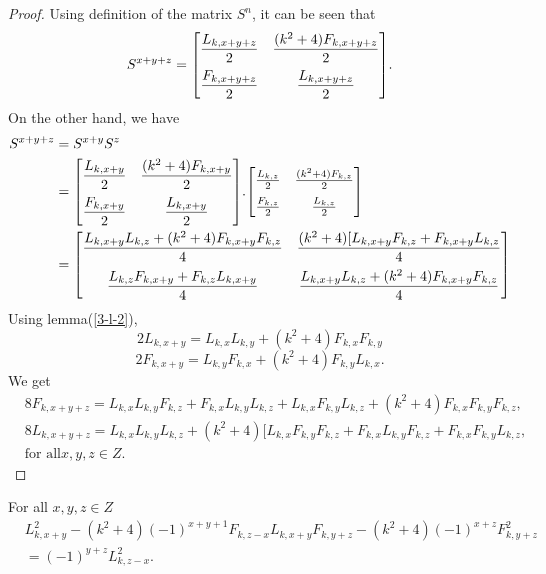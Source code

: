 \begin{proof}
Using definition of the matrix $S^n$, it can be seen that 
$$S^{x+y+z}={
 \begin{bmatrix}{}
    \dfrac{L_{k,x+y+z}}{2} & \dfrac{(k^2+4)F_{k,x+y+z}}{2}\vspace{.2cm} \\
    \dfrac{F_{k,x+y+z}}{2}& \dfrac{L_{k,x+y+z}}{2} \\
	\end{bmatrix}
	}.$$
	On the other hand, we have
	\begin{align*}
	S^{x+y+z}&=S^{x+y}S^z\\
 &={
 \begin{bmatrix}{}
    \dfrac{L_{k,x+y}}{2} & \dfrac{(k^2+4)F_{k,x+y}}{2}\vspace{.2cm} \\
    \dfrac{F_{k,x+y}}{2} & \dfrac{L_{k,x+y}}{2} \\
	\end{bmatrix}
	}.{
 \begin{bmatrix}{}
    \frac{L_{k,z}}{2} & \frac{(k^2+4)F_{k,z}}{2}\vspace{.2cm} \\
    \frac{F_{k,z}}{2} & \frac{L_{k,z}}{2} \\
	\end{bmatrix}
	}\\
 &={
 \begin{bmatrix}{}
    \dfrac{L_{k,x+y}L_{k,z}+(k^2+4)F_{k,x+y}F_{k,z}}{4} & \dfrac{(k^2+4)[L_{k,x+y}F_{k,z}+F_{k,x+y}L_{k,z}}{4}\vspace{.2cm} \\
    \dfrac{L_{k,z}F_{k,x+y}+F_{k,z}L_{k,x+y}}{4} & \dfrac{L_{k,x+y}L_{k,z}+(k^2+4)F_{k,x+y}F_{k,z}}{4} \\
	\end{bmatrix}
	}
	\end{align*}
	Using lemma(\ref{3-l-2}),
	$$2L_{k,x+y}=L_{k,x}L_{k,y}+(k^2+4)F_{k,x}F_{k,y}$$
	$$2F_{k,x+y}=L_{k,y}F_{k,x}+(k^2+4)F_{k,y}L_{k,x}.$$
We get
\begin{align*}
&8F_{k,x+y+z}=L_{k,x}L_{k,y}F_{k,z}+F_{k,x}L_{k,y}L_{k,z}+L_{k,x}F_{k,y}L_{k,z}+(k^2+4)F_{k,x}F_{k,y}F_{k,z},\\ 
&8L_{k,x+y+z}=L_{k,x}L_{k,y}L_{k,z}+(k^2+4)[L_{k,x}F_{k,y}F_{k,z}+F_{k,x}L_{k,y}F_{k,z}+F_{k,x}F_{k,y}L_{k,z}, \\&\text{for all} x,y,z\in Z.
\end{align*}
\end{proof}
\begin{theorem}
For all $x,y,z\in Z$
\begin{align*}
&L^2_{k,x+y}-(k^2+4)(-1)^{x+y+1}F_{k,z-x}L_{k,x+y}F_{k,y+z}-(k^2+4)(-1)^{x+z}F^2_{k,y+z}\\&=(-1)^{y+z}L^2_{k,z-x}.
\end{align*}
\end{theorem}
